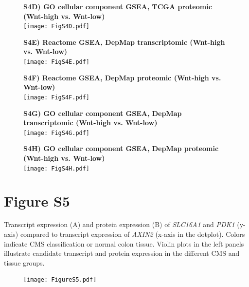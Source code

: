 \documentclass[11pt,a4paper,titlepage]{article}
\begin{document}
\begin{figure}[h!]
\textbf{S4D) GO cellular component GSEA, TCGA proteomic (Wnt-high vs. Wnt-low)}\\

\smallskip
\texttt{[image: FigS4D.pdf]} 
\end{figure}

\begin{figure}[h!]
\textbf{S4E) Reactome GSEA, DepMap transcriptomic (Wnt-high vs. Wnt-low)}\\

\smallskip
\texttt{[image: FigS4E.pdf]} 
\end{figure}

\begin{figure}[h!]
\textbf{S4F) Reactome GSEA, DepMap proteomic (Wnt-high vs. Wnt-low)}\\

\smallskip
\texttt{[image: FigS4F.pdf]} 
\end{figure}

\begin{figure}[h!]
\textbf{S4G) GO cellular component GSEA, DepMap transcriptomic (Wnt-high vs. Wnt-low)}\\

\smallskip
\texttt{[image: FigS4G.pdf]} 
\end{figure}

\begin{figure}[h!]
\textbf{S4H) GO cellular component GSEA, DepMap proteomic (Wnt-high vs. Wnt-low)}\\

\smallskip
\texttt{[image: FigS4H.pdf]} 
\end{figure}


\clearpage

\section*{Figure S5}

Transcript expression (A) and protein expression (B) of \textit{SLC16A1} and \textit{PDK1} (y-axis) compared to transcript expression of \textit{AXIN2} (x-axis in the dotplot). Colors indicate CMS classification or normal colon tissue. Violin plots in the left panels illustrate candidate transcript and protein expression in the different CMS and tissue groups.

\begin{figure}[h]
\texttt{[image: FigureS5.pdf]} 

\end{figure}
\end{document}

